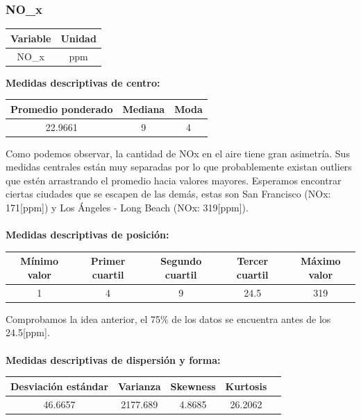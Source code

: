 \documentclass[11pt]{article}
\begin{document}
\subsubsection{NO_x}

\begin{center}
\begin{tabular}{|c|c|}
    \hline
    Variable & Unidad  \\ \hline
    NO_x & ppm \\
    \hline
\end{tabular}
\end{center}

\textbf{Medidas descriptivas de centro:}

\begin{center}
\begin{tabular}{|c|c|c|}
    \hline
    Promedio ponderado & Mediana & Moda \\ \hline
    22.9661 & 9 & 4 \\
    \hline
\end{tabular}
\end{center}

Como podemos observar, la cantidad de NOx en el aire tiene gran asimetría. Sus medidas centrales están muy separadas por lo que probablemente existan outliers que estén arrastrando el promedio hacia valores mayores. Esperamos encontrar ciertas ciudades que se escapen de las demás, estas son San Francisco (NOx: 171[ppm]) y Los Ángeles - Long Beach (NOx: 319[ppm]).
\\
\\
\textbf{Medidas descriptivas de posición:}

\begin{center}
\begin{tabular}{|c|c|c|c|c|}
    \hline
    Mínimo valor & Primer cuartil & Segundo cuartil & Tercer cuartil & Máximo valor\\ \hline
    1 & 4 & 9 & 24.5 & 319\\
    \hline
\end{tabular}
\end{center}

Comprobamos la idea anterior, el 75\% de los datos se encuentra antes de los 24.5[ppm].
\\
\\
\textbf{Medidas descriptivas de dispersión y forma:}

\begin{center}
\begin{tabular}{|c|c|c|c|c|}
    \hline
    Desviación estándar  & Varianza & Skewness & Kurtosis\\ \hline
    46.6657 & 2177.689 & 4.8685 & 26.2062\\
    \hline
\end{tabular}
\end{center}
\end{document}
